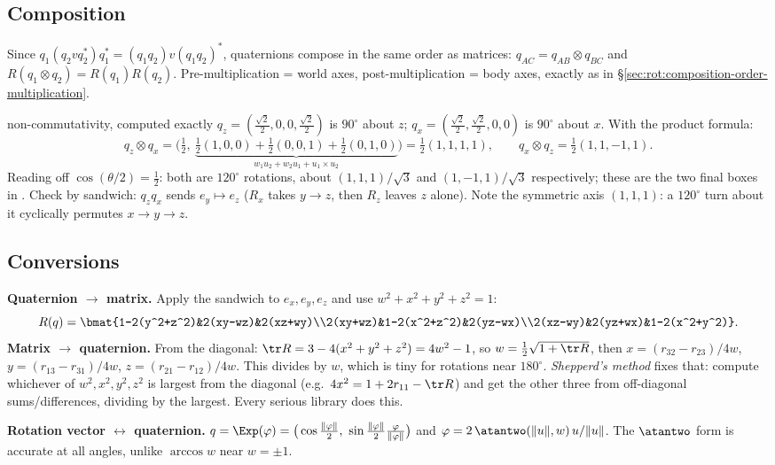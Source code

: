 \subsection{Composition}\label{sec:rot:composition}
Since $q_1(q_2vq_2^*)q_1^*=(q_1q_2)v(q_1q_2)^*$, quaternions compose in the same order as matrices: $q_{AC}=q_{AB}\otimes q_{BC}$ and $R(q_1\otimes q_2)=R(q_1)R(q_2)$. Pre-multiplication = world axes, post-multiplication = body axes, exactly as in \S\ref{sec:rot:composition-order-multiplication}.

\begin{example}{non-commutativity, computed exactly}
$q_z=(\tfrac{\sqrt2}2,0,0,\tfrac{\sqrt2}2)$ is $90^\circ$ about $z$; $q_x=(\tfrac{\sqrt2}2,\tfrac{\sqrt2}2,0,0)$ is $90^\circ$ about $x$. With the product formula:
\[
q_z\otimes q_x=\big(\tfrac12,\ \underbrace{\tfrac12(1,0,0)+\tfrac12(0,0,1)+\tfrac12(0,1,0)}_{w_1u_2+w_2u_1+u_1\times u_2}\big)=\tfrac12(1,1,1,1),\qquad q_x\otimes q_z=\tfrac12(1,1,-1,1).
\]
Reading off $\cos(\theta/2)=\frac12$: both are $120^\circ$ rotations, about $(1,1,1)/\sqrt3$ and $(1,-1,1)/\sqrt3$ respectively; these are the two final boxes in . Check by sandwich: $q_zq_x$ sends $e_y\mapsto e_z$ ($R_x$ takes $y\to z$, then $R_z$ leaves $z$ alone). Note the symmetric axis $(1,1,1)$: a $120^\circ$ turn about it cyclically permutes $x\to y\to z$.
\end{example}

\subsection{Conversions}\label{sec:rot:conversions}
\textbf{Quaternion $\to$ matrix.} Apply the sandwich to $e_x,e_y,e_z$ and use $w^2+x^2+y^2+z^2=1$:
\[
R(q)=\bmat{1-2(y^2+z^2)&2(xy-wz)&2(xz+wy)\\2(xy+wz)&1-2(x^2+z^2)&2(yz-wx)\\2(xz-wy)&2(yz+wx)&1-2(x^2+y^2)}.
\]
\textbf{Matrix $\to$ quaternion.} From the diagonal: $\tr R=3-4(x^2+y^2+z^2)=4w^2-1$, so $w=\frac12\sqrt{1+\tr R}$, then $x=(r_{32}-r_{23})/4w$, $y=(r_{13}-r_{31})/4w$, $z=(r_{21}-r_{12})/4w$. This divides by $w$, which is tiny for rotations near $180^\circ$. \emph{Shepperd's method} fixes that: compute whichever of $w^2,x^2,y^2,z^2$ is largest from the diagonal (e.g.\ $4x^2=1+2r_{11}-\tr R$) and get the other three from off-diagonal sums/differences, dividing by the largest. Every serious library does this.

\textbf{Rotation vector $\leftrightarrow$ quaternion.} $q=\Exp(\varphi)=\big(\cos\frac{\|\varphi\|}2,\ \sin\frac{\|\varphi\|}2\frac{\varphi}{\|\varphi\|}\big)$ and $\varphi=2\,\atantwo(\|u\|,w)\,u/\|u\|$. The $\atantwo$ form is accurate at all angles, unlike $\arccos w$ near $w=\pm1$.

